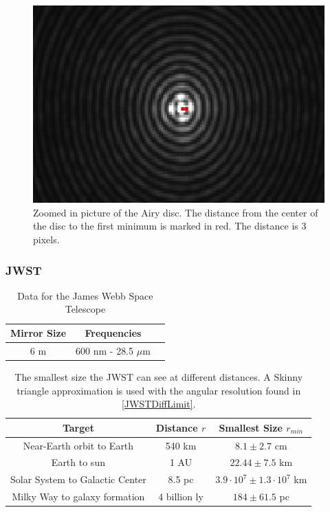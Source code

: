 \documentclass{emulateapj}
\begin{document}
\begin{figure}[H]
\centering
\includegraphics[scale=0.4]{Airy3zoomed2.png}
\caption{Zoomed in picture of the Airy disc. The distance from the center of the disc to the first minimum is marked in red. The distance is 3 pixels.}
\end{figure}

\subsubsection{JWST}
\begin{table}[H]
\centering
\begin{tabular}{ c c c }
Mirror Size & Frequencies \\
\hline
6 m & 600 nm - 28.5 $\mu$m 
\end{tabular}
\caption{Data for the James Webb Space Telescope}
\end{table}\label{tab:dataJWST}

\begin{table}[H]
\centering
\begin{tabular}{ c c c }
Target & Distance $r$ & Smallest Size $r_{min}$ \\
\hline
Near-Earth orbit to Earth & 540 km &$8.1 \pm 2.7$ cm \\
Earth to sun & 1 AU & $22.44 \pm 7.5$ km \\
Solar System to Galactic Center & 8.5 pc & $3.9\cdot 10^7 \pm 1.3\cdot 10^7$ km \\
Milky Way to galaxy formation &  4 billion ly & $184 \pm 61.5$ pc 
\end{tabular}
\caption{The smallest size the JWST can see at different distances. A Skinny triangle approximation is used with the angular resolution found in \eqref{JWSTDiffLimit}.}
\end{table}\label{tab:visionJWST}
\end{document}
